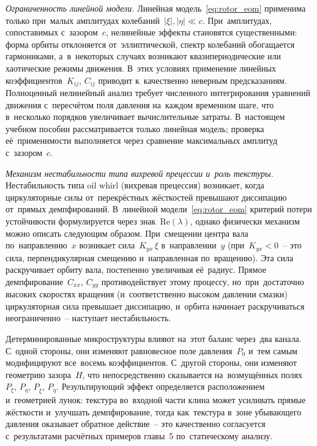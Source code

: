 \textit{Ограниченность линейной модели.}
Линейная модель~\eqref{eq:rotor_eom} применима только при~малых амплитудах колебаний~$|\xi|, |\eta| \ll c$. При~амплитудах, сопоставимых с~зазором~$c$, нелинейные эффекты становятся существенными: форма орбиты отклоняется от~эллиптической, спектр колебаний обогащается гармониками, а~в~некоторых случаях возникают квазипериодические или хаотические режимы движения. В~этих условиях применение линейных коэффициентов~$K_{ij}$, $C_{ij}$ приводит к~качественно неверным предсказаниям. Полноценный нелинейный анализ требует численного интегрирования уравнений движения с~пересчётом поля давления на~каждом временном шаге, что в~несколько порядков увеличивает вычислительные затраты. В~настоящем учебном пособии рассматривается только линейная модель; проверка её~применимости выполняется через сравнение максимальных амплитуд с~зазором~$c$.

\textit{Механизм нестабильности типа вихревой прецессии и~роль текстуры.}
Нестабильность типа oil whirl (вихревая прецессия) возникает, когда циркуляторные силы от~перекрёстных жёсткостей превышают диссипацию от~прямых демпфирований. В~линейной модели~\eqref{eq:rotor_eom} критерий потери устойчивости формулируется через знак~$\mathrm{Re}(\lambda)$, однако физически механизм можно описать следующим образом. При~смещении центра вала по~направлению~$x$ возникает сила~$K_{yx}\,\xi$ в~направлении~$y$ (при~$K_{yx} < 0$~-- это сила, перпендикулярная смещению и~направленная по~вращению). Эта сила раскручивает орбиту вала, постепенно увеличивая её~радиус. Прямое демпфирование~$C_{xx}$, $C_{yy}$ противодействует этому процессу, но~при~достаточно высоких скоростях вращения (и~соответственно высоком давлении смазки) циркуляторная сила превышает диссипацию, и~орбита начинает раскручиваться неограниченно~-- наступает нестабильность.

Детерминированные микроструктуры влияют на~этот баланс через~два канала. С~одной стороны, они изменяют равновесное поле давления~$P_0$ и~тем самым модифицируют все~восемь коэффициентов. С~другой стороны, они изменяют геометрию зазора~$H$, что непосредственно сказывается на~возмущённых полях~$P_\xi$, $P_\eta$, $P_{\dot\xi}$, $P_{\dot\eta}$. Результирующий эффект определяется расположением и~геометрией лунок: текстура во~входной части клина может усиливать прямые жёсткости и~улучшать демпфирование, тогда как~текстура в~зоне убывающего давления оказывает обратное действие~-- это качественно согласуется с~результатами расчётных примеров главы~5 по~статическому анализу.


